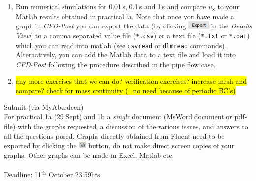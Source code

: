 \documentclass[11pt,a4paper,oneside,hidelinks]{scrartcl}
\begin{document}
\begin{enumerate}
\item Run numerical simulations for 0.01\,s, 0.1\,s and 1\,s and compare $u_\mathrm{x}$ to your Matlab results obtained in practical\,1a. Note that once you have made a graph in \emph{CFD-Post} you can export the data (by clicking \includegraphics[width=1.1cm,clip]{export_icon.png} in the \emph{Details View}) to a comma separated value file (\texttt{*.csv}) or a text file (\texttt{*.txt} or \texttt{*.dat}) which you can read into matlab (see \texttt{csvread} or \texttt{dlmread} commands). Alternatively, you can add the Matlab data to a text file and load it into \emph{CFD-Post} following the procedure described in the pipe flow case. 
\item 

\hl{any more exercises that we can do? verification exercises? increase mesh and compare? check for mass continuity (=no need because of periodic BC's)}
\end{enumerate}



\vspace{2cm}
Submit (via MyAberdeen)\\
For practical 1a (29 Sept) and 1b a \emph{single} document (MsWord document or pdf-file) with the graphs requested, a discussion of the various issues, and answers to all the questions posed. Graphs directly obtained from Fluent need to be exported by clicking the \includegraphics[width=.4cm]{export_fig_icon.png} button, do not make direct screen copies of your graphs. Other graphs can be made in Excel, Matlab etc.
\\
\\
Deadline: 11$^\mathrm{th}$ October 23:59hrs
\end{document}
